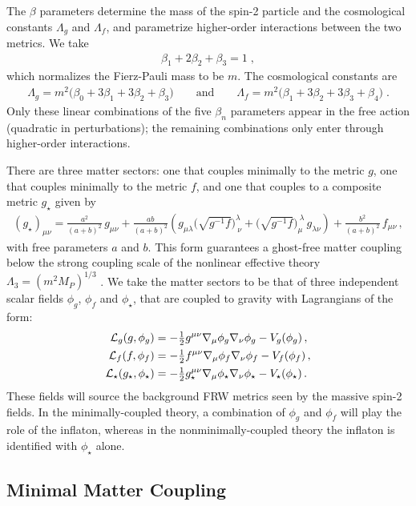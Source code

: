 \documentclass[11pt,a4paper]{article}
\newcommand{\bsa}[2]{\begin{subequations}\label{#1}\begin{align} #2 \end{align}\end{subequations}}
\newcommand{\Mpl}{M_P}
\newcommand{\bea}{\begin{eqnarray}}
\newcommand{\eea}{\end{eqnarray}}
\begin{document}
The $\beta$ parameters determine the mass of the spin-2 particle and the cosmological constants $\Lambda_g$ and $\Lambda_f$, and parametrize higher-order interactions between the two metrics.  We take 
\bea
	\label{mass}
	\beta_1 + 2 \beta_2 + \beta_3 = 1
	\;,
\eea
which normalizes the Fierz-Pauli mass to be $m$.  The cosmological constants are
\bea
\label{cc}
	\Lambda_g = m^2 \bigl( \beta_0 + 3 \beta_1 + 3 \beta_2 + \beta_3 \bigr) 
	\qquad \text{and} \qquad 
	\Lambda_f = m^2 \bigl( \beta_1 + 3 \beta_2 + 3 \beta_3 + \beta_4 \bigr) 
	\;.
\eea
Only these linear combinations of the five $\beta_n$ parameters appear in the free action (quadratic in perturbations); the remaining combinations only enter through higher-order interactions.  

There are three matter sectors: one that couples minimally to the metric $g$, one that couples minimally to the metric $f$, and one that couples to a composite metric $g_\star$ given by
\bea
\label{geff}
(g_\star)_{\mu\nu} = \frac{a^2}{(a+b)^2}\,g_{\mu\nu}+\frac{ab}{(a+b)^2}\left( g_{\mu\lambda} \bigl( \sqrt{g^{-1}f} \bigr)^\lambda_{~\nu} + \bigl( \sqrt{g^{-1}f} \bigr)_\mu^{~\lambda} \, g_{\lambda \nu} \right)+\frac{b^2}{(a+b)^2}\,f_{\mu\nu}\, ,
\eea
with free parameters $a$ and $b$.  This form guarantees a ghost-free matter coupling below the strong coupling scale of the nonlinear effective theory $\Lambda_3=(m^2\Mpl)^{1/3}$ \cite{deRham:2014naa}. 
We take the matter sectors to be that of three independent scalar fields $\phi_g$, $\phi_f$ and $\phi_\star$, that are coupled to gravity with Lagrangians of the form:
\bsa{eq:Lagrangians}{
    {\cal L }_g(g,\phi_g) & = -\tfrac{1}{2}g^{\mu\nu} \nabla_\mu \phi_g \nabla_\nu \phi_g - V_g(\phi_g) \, ,\\
    {\cal L }_f(f,\phi_f) & = -\tfrac{1}{2}f^{\mu\nu} \nabla_\mu \phi_f \nabla_\nu \phi_f - V_f(\phi_f) \, ,\\
    {\cal L }_\star(g_\star,\phi_\star) & = -\tfrac{1}{2}g_\star^{\mu\nu} \nabla_\mu \phi_\star \nabla_\nu \phi_\star - V_\star(\phi_\star) \, .
}
These fields will source the background FRW metrics seen by the massive spin-2 fields. In the minimally-coupled theory, a combination of $\phi_g$ and $\phi_f$ will play the role of the inflaton, whereas in the nonminimally-coupled theory the inflaton is identified with $\phi_\star$ alone.  

\subsection{Minimal Matter Coupling}
\label{sub:minimal_theory}
\end{document}
